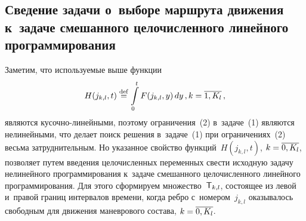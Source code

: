 \begin{multicols}{2}
\vspace*{-8pt}

\section{Сведение задачи о~выборе маршрута движения к~задаче 
смешанного целочисленного линейного программирования}

\vspace*{-2pt}

Заметим, что используемые выше функции 
$$H(j_{k,l},t) 
\stackrel{\mathrm{def}}{=} \int\limits_0^t F(j_{k,l},y)\,dy\,, 
k\hm= \overline{1,K_l}\,,$$
являются ку\-соч\-но-ли\-ней\-ны\-ми, поэтому ограничения~(2) 
в~задаче~(1) являются нелинейными, что делает поиск решения в~задаче~(1) при 
ограничениях~(2) весьма затруднительным. Но указанное свойство 
функций~$H(j_{k,l},t)$, $k\hm= \overline{0,K_l}$, позволяет путем введения 
целочисленных переменных свести исходную задачу нелинейного 
программирования к~задаче смешанного целочисленного линейного 
программирования. Для этого сформируем множество~${\sf T}_{k,l}$, состоящее 
из левой и~правой границ интервалов времени, когда ребро с~номером~$j_{k,l}$ 
оказывалось свободным для движения маневрового состава, $k\hm= 
\overline{0,K_l}$.
\pagebreak
      

\end{multicols}
